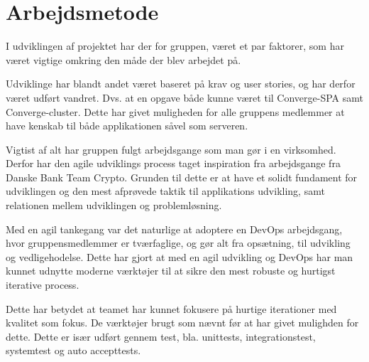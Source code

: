 \section{Arbejdsmetode}

I udviklingen af projektet har der for gruppen, været et par faktorer, som har været vigtige omkring den måde der blev arbejdet på.

Udviklinge har blandt andet været baseret på krav og user stories, og har derfor været udført vandret. Dvs. at en opgave både kunne været til Converge-SPA samt Converge-cluster. Dette har givet muligheden for alle gruppens medlemmer at have kenskab til både applikationen såvel som serveren.

Vigtist af alt har gruppen fulgt arbejdsgange som man gør i en virksomhed. Derfor har den agile udviklings process taget inspiration fra arbejdsgange fra Danske Bank Team Crypto. Grunden til dette er at have et solidt fundament for udviklingen og den mest afprøvede taktik til applikations udvikling, samt relationen mellem udviklingen og problemløsning.

Med en agil tankegang var det naturlige at adoptere en DevOps arbejdsgang, hvor gruppensmedlemmer er tværfaglige, og gør alt fra opsætning, til udvikling og vedligehodelse. Dette har gjort at med en agil udvikling og DevOps har man kunnet udnytte moderne værktøjer til at sikre den mest robuste og hurtigst iterative process.

Dette har betydet at teamet har kunnet fokusere på hurtige iterationer med kvalitet som fokus. De værktøjer brugt som nævnt før at har givet mulighden for dette. Dette er især udført gennem test, bla. unittests, integrationstest, systemtest og auto accepttests.